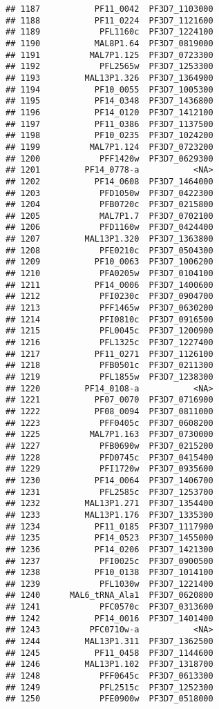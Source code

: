 \documentclass{article}\usepackage[]{graphicx}\usepackage[]{color}
\makeatletter
\newenvironment{kframe}{%
 \def\at@end@of@kframe{}%
 \ifinner\ifhmode%
  \def\at@end@of@kframe{\end{minipage}}%
  \begin{minipage}{\columnwidth}%
 \fi\fi%
 \def\FrameCommand##1{\hskip\@totalleftmargin \hskip-\fboxsep
 \colorbox{shadecolor}{##1}\hskip-\fboxsep
     \hskip-\linewidth \hskip-\@totalleftmargin \hskip\columnwidth}%
 \MakeFramed {\advance\hsize-\width
   \@totalleftmargin\z@ \linewidth\hsize
   \@setminipage}}%
 {\par\unskip\endMakeFramed%
 \at@end@of@kframe}
\newenvironment{knitrout}{}{} %
\makeatother
\begin{document}
\begin{knitrout}
\begin{kframe}
\begin{verbatim}
## 1187           PF11_0042  PF3D7_1103000
## 1188           PF11_0224  PF3D7_1121600
## 1189            PFL1160c  PF3D7_1224100
## 1190           MAL8P1.64  PF3D7_0819000
## 1191          MAL7P1.125  PF3D7_0723300
## 1192            PFL2565w  PF3D7_1253300
## 1193         MAL13P1.326  PF3D7_1364900
## 1194           PF10_0055  PF3D7_1005300
## 1195           PF14_0348  PF3D7_1436800
## 1196           PF14_0120  PF3D7_1412100
## 1197           PF11_0386  PF3D7_1137500
## 1198           PF10_0235  PF3D7_1024200
## 1199          MAL7P1.124  PF3D7_0723200
## 1200            PFF1420w  PF3D7_0629300
## 1201         PF14_0778-a           <NA>
## 1202           PF14_0608  PF3D7_1464000
## 1203            PFD1050w  PF3D7_0422300
## 1204            PFB0720c  PF3D7_0215800
## 1205            MAL7P1.7  PF3D7_0702100
## 1206            PFD1160w  PF3D7_0424400
## 1207         MAL13P1.320  PF3D7_1363800
## 1208            PFE0210c  PF3D7_0504300
## 1209           PF10_0063  PF3D7_1006200
## 1210            PFA0205w  PF3D7_0104100
## 1211           PF14_0006  PF3D7_1400600
## 1212            PFI0230c  PF3D7_0904700
## 1213            PFF1465w  PF3D7_0630200
## 1214            PFI0810c  PF3D7_0916500
## 1215            PFL0045c  PF3D7_1200900
## 1216            PFL1325c  PF3D7_1227400
## 1217           PF11_0271  PF3D7_1126100
## 1218            PFB0501c  PF3D7_0211300
## 1219            PFL1855w  PF3D7_1238300
## 1220         PF14_0108-a           <NA>
## 1221           PF07_0070  PF3D7_0716900
## 1222           PF08_0094  PF3D7_0811000
## 1223            PFF0405c  PF3D7_0608200
## 1225          MAL7P1.163  PF3D7_0730000
## 1227            PFB0690w  PF3D7_0215200
## 1228            PFD0745c  PF3D7_0415400
## 1229            PFI1720w  PF3D7_0935600
## 1230           PF14_0064  PF3D7_1406700
## 1231            PFL2585c  PF3D7_1253700
## 1232         MAL13P1.271  PF3D7_1354400
## 1233         MAL13P1.176  PF3D7_1335300
## 1234           PF11_0185  PF3D7_1117900
## 1235           PF14_0523  PF3D7_1455000
## 1236           PF14_0206  PF3D7_1421300
## 1237            PFI0025c  PF3D7_0900500
## 1238           PF10_0138  PF3D7_1014100
## 1239            PFL1030w  PF3D7_1221400
## 1240      MAL6_tRNA_Ala1  PF3D7_0620800
## 1241            PFC0570c  PF3D7_0313600
## 1242           PF14_0016  PF3D7_1401400
## 1243          PFC0710w-a           <NA>
## 1244         MAL13P1.311  PF3D7_1362500
## 1245           PF11_0458  PF3D7_1144600
## 1246         MAL13P1.102  PF3D7_1318700
## 1248            PFF0645c  PF3D7_0613300
## 1249            PFL2515c  PF3D7_1252300
## 1250            PFE0900w  PF3D7_0518000

\end{verbatim}
\end{kframe}
\end{knitrout}
\end{document}
